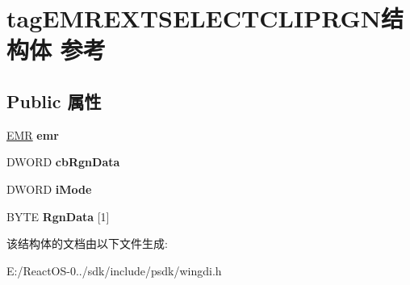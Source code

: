 \hypertarget{structtag_e_m_r_e_x_t_s_e_l_e_c_t_c_l_i_p_r_g_n}{}\section{tag\+E\+M\+R\+E\+X\+T\+S\+E\+L\+E\+C\+T\+C\+L\+I\+P\+R\+G\+N结构体 参考}
\label{structtag_e_m_r_e_x_t_s_e_l_e_c_t_c_l_i_p_r_g_n}
\subsection*{Public 属性}
\begin{DoxyCompactItemize}
\item 
\mbox{\label{structtag_e_m_r_e_x_t_s_e_l_e_c_t_c_l_i_p_r_g_n_aca91820afea28d65466be9d46fef76bb}} 
\hyperlink{structtag_e_m_r}{E\+MR} {\bfseries emr}
\item 
\mbox{\label{structtag_e_m_r_e_x_t_s_e_l_e_c_t_c_l_i_p_r_g_n_ac0864887b3bf54ae74fc6210b6cc60b4}} 
D\+W\+O\+RD {\bfseries cb\+Rgn\+Data}
\item 
\mbox{\label{structtag_e_m_r_e_x_t_s_e_l_e_c_t_c_l_i_p_r_g_n_aa77d1a35992ebc2c9274ab43afda342d}} 
D\+W\+O\+RD {\bfseries i\+Mode}
\item 
\mbox{\label{structtag_e_m_r_e_x_t_s_e_l_e_c_t_c_l_i_p_r_g_n_ab0375cf6a549e3e8b7d370b952c4a120}} 
B\+Y\+TE {\bfseries Rgn\+Data} \mbox{[}1\mbox{]}
\end{DoxyCompactItemize}


该结构体的文档由以下文件生成\+:\begin{DoxyCompactItemize}
\item 
E\+:/\+React\+O\+S-\/0../sdk/include/psdk/wingdi.\+h\end{DoxyCompactItemize}
